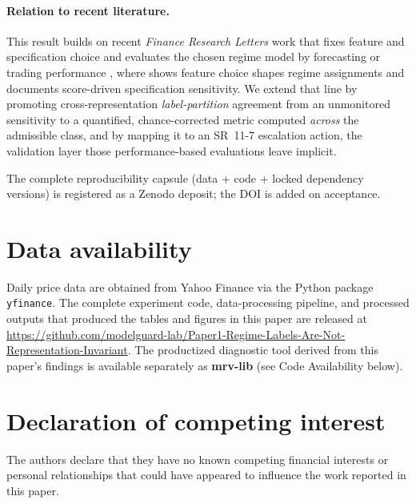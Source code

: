 \documentclass[preprint,12pt,authoryear]{elsarticle}
\begin{document}
\paragraph{Relation to recent literature.}
This result builds on recent \emph{Finance Research Letters} work that fixes feature and specification choice and evaluates the chosen regime model by forecasting or trading performance \citep{Kirby2023FRL,BlazsekKongShadoff2025,Ampountolas2025FRL,WangYuanQu2025FRL}, where \citet{Ampountolas2025FRL} shows feature choice shapes regime assignments and \citet{BlazsekKongShadoff2025} documents score-driven specification sensitivity. We extend that line by promoting cross-representation \emph{label-partition} agreement from an unmonitored sensitivity to a quantified, chance-corrected metric computed \emph{across} the admissible class, and by mapping it to an SR~11-7 escalation action, the validation layer those performance-based evaluations leave implicit.

%

The complete reproducibility capsule (data + code + locked dependency versions) is registered as a Zenodo deposit; the DOI is added on acceptance.

\section*{Data availability}

Daily price data are obtained from Yahoo Finance via the Python package \texttt{yfinance}. The complete experiment code, data-processing pipeline, and processed outputs that produced the tables and figures in this paper are released at \url{https://github.com/modelguard-lab/Paper1-Regime-Labels-Are-Not-Representation-Invariant}. The productized diagnostic tool derived from this paper's findings is available separately as \textbf{mrv-lib} (see Code Availability below).

\section*{Declaration of competing interest}

The authors declare that they have no known competing financial interests or personal relationships that could have appeared to influence the work reported in this paper.
\end{document}
